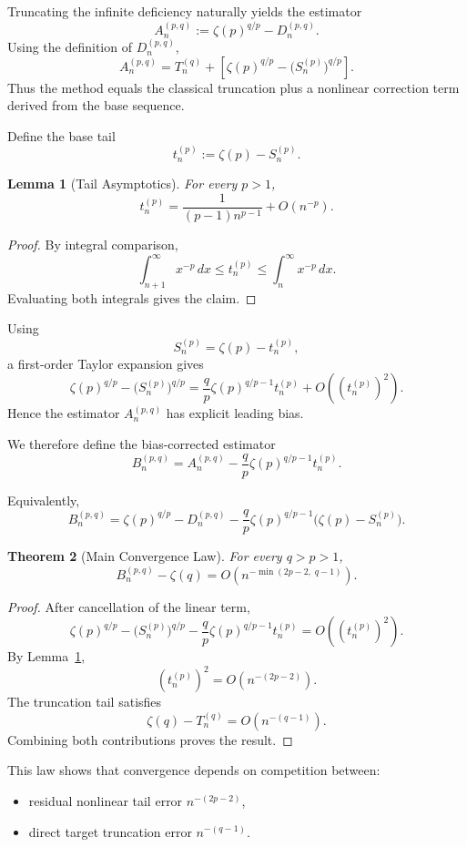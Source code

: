 \documentclass[11pt]{article}
\numberwithin{equation}{section}
\newtheorem{theorem}{Theorem}[section]
\newtheorem{lemma}[theorem]{Lemma}
\theoremstyle{definition}
\begin{document}
Truncating the infinite deficiency naturally yields the estimator
\[
A_n^{(p,q)}
:=
\zeta(p)^{q/p}-D_n^{(p,q)}.
\]
Using the definition of \(D_n^{(p,q)}\),
\[
A_n^{(p,q)}
=
T_n^{(q)}
+
\left[
\zeta(p)^{q/p}-\bigl(S_n^{(p)}\bigr)^{q/p}
\right].
\]
Thus the method equals the classical truncation plus a nonlinear correction term derived from the base sequence.

Define the base tail
\[
t_n^{(p)}:=\zeta(p)-S_n^{(p)}.
\]

\begin{lemma}[Tail Asymptotics]
\label{lem:tail}
For every \(p>1\),
\[
t_n^{(p)}
=
\frac{1}{(p-1)n^{p-1}}+O(n^{-p}).
\]
\end{lemma}

\begin{proof}
By integral comparison,
\[
\int_{n+1}^{\infty}x^{-p}\,dx
\le t_n^{(p)}
\le \int_n^\infty x^{-p}\,dx.
\]
Evaluating both integrals gives the claim.
\end{proof}

Using
\[
S_n^{(p)}=\zeta(p)-t_n^{(p)},
\]
a first-order Taylor expansion gives
\[
\zeta(p)^{q/p}-\bigl(S_n^{(p)}\bigr)^{q/p}
=
\frac{q}{p}\zeta(p)^{q/p-1}t_n^{(p)}
+
O\!\left((t_n^{(p)})^2\right).
\]
Hence the estimator \(A_n^{(p,q)}\) has explicit leading bias.

We therefore define the bias-corrected estimator
\[
B_n^{(p,q)}
=
A_n^{(p,q)}
-
\frac{q}{p}\zeta(p)^{q/p-1}t_n^{(p)}.
\]

Equivalently,
\[
B_n^{(p,q)}
=
\zeta(p)^{q/p}
-
D_n^{(p,q)}
-
\frac{q}{p}\zeta(p)^{q/p-1}
\bigl(\zeta(p)-S_n^{(p)}\bigr).
\]

\begin{theorem}[Main Convergence Law]
\label{thm:rate}
For every \(q>p>1\),
\[
\boxed{
B_n^{(p,q)}-\zeta(q)
=
O\!\left(n^{-\min(2p-2,\;q-1)}\right).
}
\]
\end{theorem}

\begin{proof}
After cancellation of the linear term,
\[
\zeta(p)^{q/p}
-
\bigl(S_n^{(p)}\bigr)^{q/p}
-
\frac{q}{p}\zeta(p)^{q/p-1}t_n^{(p)}
=
O((t_n^{(p)})^2).
\]
By Lemma~\ref{lem:tail},
\[
(t_n^{(p)})^2=O(n^{-(2p-2)}).
\]
The truncation tail satisfies
\[
\zeta(q)-T_n^{(q)}=O(n^{-(q-1)}).
\]
Combining both contributions proves the result.
\end{proof}

This law shows that convergence depends on competition between:

\begin{itemize}
\item residual nonlinear tail error \(n^{-(2p-2)}\),
\item direct target truncation error \(n^{-(q-1)}\).
\end{itemize}
\end{document}
